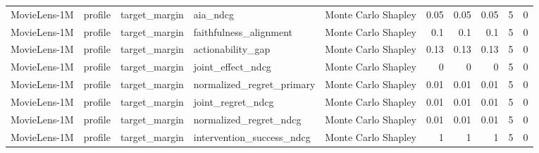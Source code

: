 \begin{table}[t]
{\begin{tabular}{lllllrrrrr}
MovieLens-1M & profile & target\_margin & aia\_ndcg & Monte Carlo Shapley & 0.05 & 0.05 & 0.05 & 5 & 0 \\
MovieLens-1M & profile & target\_margin & faithfulness\_alignment & Monte Carlo Shapley & 0.1 & 0.1 & 0.1 & 5 & 0 \\
MovieLens-1M & profile & target\_margin & actionability\_gap & Monte Carlo Shapley & 0.13 & 0.13 & 0.13 & 5 & 0 \\
MovieLens-1M & profile & target\_margin & joint\_effect\_ndcg & Monte Carlo Shapley & 0 & 0 & 0 & 5 & 0 \\
MovieLens-1M & profile & target\_margin & normalized\_regret\_primary & Monte Carlo Shapley & 0.01 & 0.01 & 0.01 & 5 & 0 \\
MovieLens-1M & profile & target\_margin & joint\_regret\_ndcg & Monte Carlo Shapley & 0.01 & 0.01 & 0.01 & 5 & 0 \\
MovieLens-1M & profile & target\_margin & normalized\_regret\_ndcg & Monte Carlo Shapley & 0.01 & 0.01 & 0.01 & 5 & 0 \\
MovieLens-1M & profile & target\_margin & intervention\_success\_ndcg & Monte Carlo Shapley & 1 & 1 & 1 & 5 & 0 \\
\bottomrule
\end{tabular}
}
\end{table}
